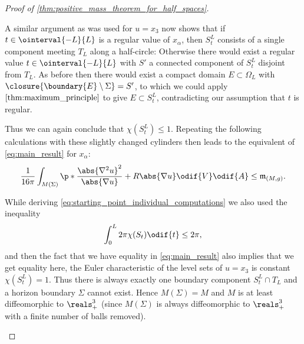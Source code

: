 \documentclass[titlepage,numbers=noenddot,headinclude,oneside,%
footinclude=true,cleardoublepage=empty,%
BCOR=5mm,paper=a4,fontsize=11pt,%
english,%
]{scrartcl}
\newcommand{\mass}[2]{\mathfrak{m}_{(#1,#2)}} %
\begin{document}
\begin{proof}[Proof of \cref{thm:positive_mass_theorem_for_half_spaces}]
\begin{proofdescription}
        A similar argument as was used for \( u=x_3 \) now shows that if \( t\in \ointerval{-L}{L} \) is a regular value of \( x_\alpha \), then \( S_t^L \) consists of a single component meeting \( T_L \) along a half-circle: Otherwise there would exist a regular value \( t \in \ointerval{-L}{L}\) with \( S' \) a connected component of \( S_t^L \) disjoint from \( T_L \). As before then there would exist a compact domain \( E\subset \Omega_L \) with \( \closure{\boundary{E}\setminus \Sigma}=S' \), to which we could apply  \( \cref{thm:maximum_principle} \) to give \( E\subset S_t^L \), contradicting our assumption that \( t \) is regular.

        Thus we can again conclude that \( \chi(S_t^L)\leq 1 \). Repeating the following calculations with these slightly changed cylinders then leads to the equivalent of \cref{eq:main_result} for \( x_\alpha \):
        \begin{equation}
            \label{eq:main_result_for_minimal_boundary_and_parallel_coordinates}
            \frac{1}{16\pi}\int_{M(\Sigma)}\p*{\frac{\abs{\nabla^2 u}^2}{\abs{\nabla u}}+R\abs{\nabla u}}\odif{V}\odif{A}\leq \mass{M}{g}.
        \end{equation}
 
        While deriving \cref{eq:starting_point_individual_computations} we also used the inequality
        \begin{equation*}
            \int_{0}^{L}2\pi \chi(S_t)\odif{t}\leq 2\pi,
        \end{equation*}
        and then the fact that we have equality in \cref{eq:main_result} also implies that we get equality here, \ie the Euler characteristic of the level sets of \( u=x_3 \) is constant \( \chi(S_t^L)=1 \). Thus there is always exactly one boundary component \( S_t^L\cap T_L \) and a horizon boundary \( \Sigma \) cannot exist. Hence \( M(\Sigma)=M \) and \( M \) is at least diffeomorphic to \( \reals^3_+ \) (since \( M(\Sigma) \) is always diffeomorphic to \( \reals^3_+ \) with a finite number of balls removed). 


\end{proofdescription}
\end{proof}
\end{document}
